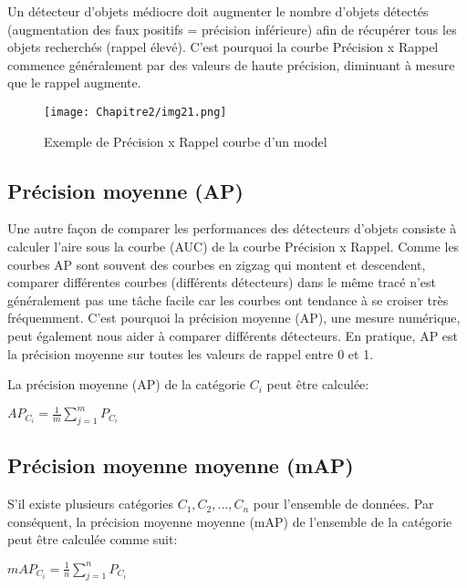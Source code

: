           Un détecteur d'objets médiocre doit augmenter le nombre d'objets détectés (augmentation des faux positifs = précision inférieure) afin de récupérer tous les objets recherchés (rappel élevé). C'est pourquoi la courbe Précision x Rappel commence généralement par des valeurs de haute précision, diminuant à mesure que le rappel augmente.
          \begin{figure}[H]
               \centering
               \texttt{[image: Chapitre2/img21.png]}
               \caption{Exemple de Précision x Rappel courbe d'un model}
               \label{img21}
               \end{figure}
          
          \subsection{Précision moyenne (AP)}
          Une autre façon de comparer les performances des détecteurs d'objets consiste à calculer l'aire sous la courbe (AUC) de la courbe Précision x Rappel. Comme les courbes AP sont souvent des courbes en zigzag qui montent et descendent, comparer différentes courbes (différents détecteurs) dans le même tracé n'est généralement pas une tâche facile car les courbes ont tendance à se croiser très fréquemment. C'est pourquoi la précision moyenne (AP), une mesure numérique, peut également nous aider à comparer différents détecteurs. En pratique, AP est la précision moyenne sur toutes les valeurs de rappel entre 0 et 1.
          
          La précision moyenne (AP) de la catégorie $C_i$ peut être calculée:
          \begin{center} $AP_{C_i} = \frac{1}{m} \sum^{m}_{j=1} P_{C_i}$ \end{center}

          \subsection{Précision moyenne moyenne  (mAP)}
          S'il existe plusieurs catégories ${C_1, C_2, ... , C_n}$ pour l'ensemble de données. Par conséquent, la précision moyenne moyenne (mAP) de l'ensemble de la catégorie peut être calculée comme suit:
          \begin{center} $mAP_{C_i} = \frac{1}{n} \sum^{n}_{j=1} P_{C_i}$ \end{center}



